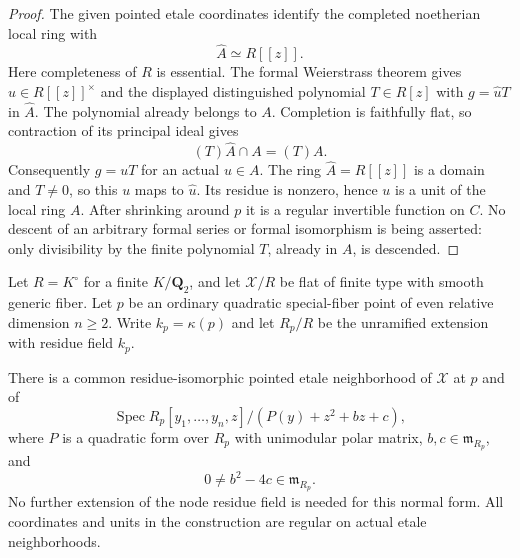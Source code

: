 \begin{proof}
The given pointed etale coordinates identify the completed
noetherian local ring with
\[
                             \widehat A\simeq R[[z]].
\]
Here completeness of $R$ is essential. The formal
Weierstrass theorem gives $\widehat u\in R[[z]]^\times$
and the displayed distinguished polynomial $T\in R[z]$
with $g=\widehat uT$ in $\widehat A$.
The polynomial already belongs to $A$. Completion is
faithfully flat, so contraction of its principal ideal gives
\[
                         (T)\widehat A\cap A=(T)A.
 \tag{NF217.1}\label{r17nf:ideal-contraction}
\]
Consequently $g=uT$ for an actual $u\in A$.
The ring $\widehat A=R[[z]]$ is a domain and $T\ne0$,
so this $u$ maps to $\widehat u$. Its residue is nonzero,
hence $u$ is a unit of the local ring $A$. After shrinking
around $p$ it is a regular invertible function on $C$.
No descent of an arbitrary formal series or formal
isomorphism is being asserted: only divisibility by the
finite polynomial $T$, already in $A$, is descended.
\end{proof}

\begin{proposition}
\label{r17nf:normal-form}
Let $R=K^\circ$ for a finite $K/\mathbf Q_2$, and let
$\mathcal X/R$ be flat of finite type with smooth generic
fiber. Let $p$ be an ordinary quadratic special-fiber point
of even relative dimension $n\ge2$. Write $k_p=\kappa(p)$
and let $R_p/R$ be the unramified extension with residue
field $k_p$.

There is a common residue-isomorphic pointed etale
neighborhood of $\mathcal X$ at $p$ and of
\[
 \operatorname{Spec}R_p[y_1,\ldots,y_n,z]
                   /(P(y)+z^2+bz+c),
 \tag{NF217.2}\label{r17nf:equation}
\]
where $P$ is a quadratic form over $R_p$ with unimodular
polar matrix, $b,c\in\mathfrak m_{R_p}$, and
\[
                          0\ne b^2-4c\in\mathfrak m_{R_p}.
 \tag{NF217.3}\label{r17nf:discriminant}
\]
No further extension of the node residue field is needed
for this normal form. All coordinates and units in the
construction are regular on actual etale neighborhoods.
\end{proposition}

